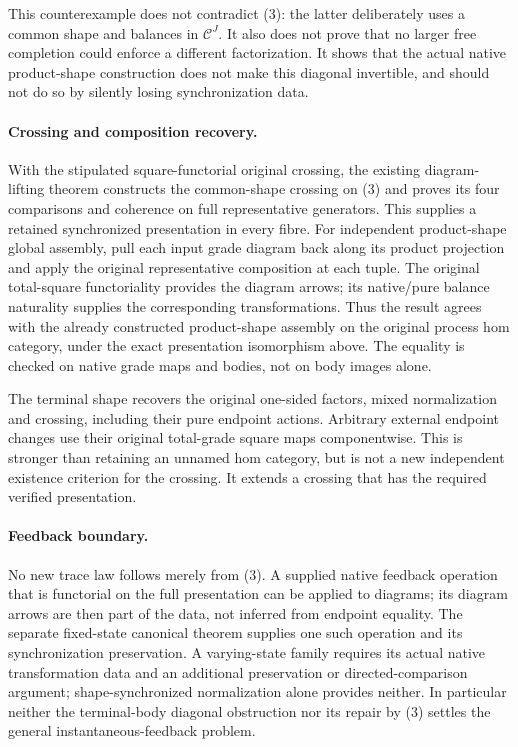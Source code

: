 \documentclass{article}
\begin{document}
This counterexample does not contradict (3): the latter deliberately uses a common shape and balances in $\mathcal C^J$. It also does not prove that no larger free completion could enforce a different factorization. It shows that the actual native product-shape construction does not make this diagonal invertible, and should not do so by silently losing synchronization data.

\paragraph{Crossing and composition recovery.} With the stipulated square-functorial original crossing, the existing diagram-lifting theorem constructs the common-shape crossing on (3) and proves its four comparisons and coherence on full representative generators. This supplies a retained synchronized presentation in every fibre. For independent product-shape global assembly, pull each input grade diagram back along its product projection and apply the original representative composition at each tuple. The original total-square functoriality provides the diagram arrows; its native/pure balance naturality supplies the corresponding transformations. Thus the result agrees with the already constructed product-shape assembly on the original process hom category, under the exact presentation isomorphism above. The equality is checked on native grade maps and bodies, not on body images alone.

The terminal shape recovers the original one-sided factors, mixed normalization and crossing, including their pure endpoint actions. Arbitrary external endpoint changes use their original total-grade square maps componentwise. This is stronger than retaining an unnamed hom category, but is not a new independent existence criterion for the crossing. It extends a crossing that has the required verified presentation.

\paragraph{Feedback boundary.} No new trace law follows merely from (3). A supplied native feedback operation that is functorial on the full presentation can be applied to diagrams; its diagram arrows are then part of the data, not inferred from endpoint equality. The separate fixed-state canonical theorem supplies one such operation and its synchronization preservation. A varying-state family requires its actual native transformation data and an additional preservation or directed-comparison argument; shape-synchronized normalization alone provides neither. In particular neither the terminal-body diagonal obstruction nor its repair by (3) settles the general instantaneous-feedback problem.
\end{document}
